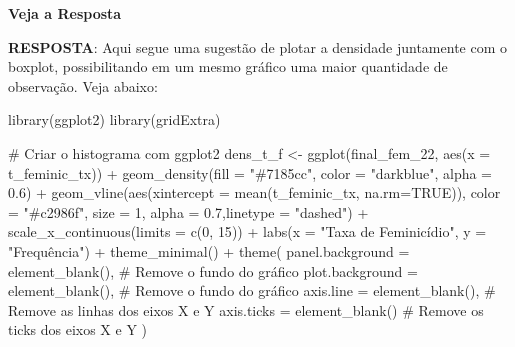 \documentclass[
  letterpaper,
  DIV=11,
  numbers=noendperiod]{scrreprt}
\newenvironment{Shaded}{\begin{snugshade}}{\end{snugshade}}
\newcommand{\AttributeTok}[1]{\textcolor[rgb]{0.40,0.45,0.13}{#1}}
\newcommand{\CommentTok}[1]{\textcolor[rgb]{0.37,0.37,0.37}{#1}}
\newcommand{\ConstantTok}[1]{\textcolor[rgb]{0.56,0.35,0.01}{#1}}
\newcommand{\DecValTok}[1]{\textcolor[rgb]{0.68,0.00,0.00}{#1}}
\newcommand{\FloatTok}[1]{\textcolor[rgb]{0.68,0.00,0.00}{#1}}
\newcommand{\FunctionTok}[1]{\textcolor[rgb]{0.28,0.35,0.67}{#1}}
\newcommand{\NormalTok}[1]{\textcolor[rgb]{0.00,0.23,0.31}{#1}}
\newcommand{\OtherTok}[1]{\textcolor[rgb]{0.00,0.23,0.31}{#1}}
\newcommand{\SpecialCharTok}[1]{\textcolor[rgb]{0.37,0.37,0.37}{#1}}
\newcommand{\StringTok}[1]{\textcolor[rgb]{0.13,0.47,0.30}{#1}}
\begin{document}
\begin{tcolorbox}[enhanced jigsaw, bottomrule=.15mm, leftrule=.75mm, arc=.35mm, colframe=quarto-callout-warning-color-frame, breakable, opacityback=0, toprule=.15mm, colback=white, left=2mm, rightrule=.15mm]
\begin{minipage}[t]{5.5mm}
\textcolor{quarto-callout-warning-color}{\faExclamationTriangle}
\end{minipage}%
\begin{minipage}[t]{\textwidth - 5.5mm}

\vspace{-3mm}\textbf{Veja a Resposta}\vspace{3mm}

\textbf{RESPOSTA}: Aqui segue uma sugestão de plotar a densidade
juntamente com o boxplot, possibilitando em um mesmo gráfico uma maior
quantidade de observação. Veja abaixo:

\begin{Shaded}
\begin{Highlighting}[]
\FunctionTok{library}\NormalTok{(ggplot2)}
\FunctionTok{library}\NormalTok{(gridExtra)}

\CommentTok{\# Criar o histograma com ggplot2}
\NormalTok{dens\_t\_f }\OtherTok{\textless{}{-}} \FunctionTok{ggplot}\NormalTok{(final\_fem\_22, }\FunctionTok{aes}\NormalTok{(}\AttributeTok{x =}\NormalTok{ t\_feminic\_tx)) }\SpecialCharTok{+}
  \FunctionTok{geom\_density}\NormalTok{(}\AttributeTok{fill =} \StringTok{"\#7185cc"}\NormalTok{, }\AttributeTok{color =} \StringTok{"darkblue"}\NormalTok{, }\AttributeTok{alpha =} \FloatTok{0.6}\NormalTok{) }\SpecialCharTok{+}
  \FunctionTok{geom\_vline}\NormalTok{(}\FunctionTok{aes}\NormalTok{(}\AttributeTok{xintercept =} \FunctionTok{mean}\NormalTok{(t\_feminic\_tx, }\AttributeTok{na.rm=}\ConstantTok{TRUE}\NormalTok{)), }\AttributeTok{color =} \StringTok{"\#c2986f"}\NormalTok{, }\AttributeTok{size =} \DecValTok{1}\NormalTok{, }\AttributeTok{alpha =} \FloatTok{0.7}\NormalTok{,}\AttributeTok{linetype =} \StringTok{"dashed"}\NormalTok{) }\SpecialCharTok{+}  
  \FunctionTok{scale\_x\_continuous}\NormalTok{(}\AttributeTok{limits =} \FunctionTok{c}\NormalTok{(}\DecValTok{0}\NormalTok{, }\DecValTok{15}\NormalTok{)) }\SpecialCharTok{+}
  \FunctionTok{labs}\NormalTok{(}\AttributeTok{x =} \StringTok{"Taxa de Feminicídio"}\NormalTok{, }\AttributeTok{y =} \StringTok{"Frequência"}\NormalTok{) }\SpecialCharTok{+}
  \FunctionTok{theme\_minimal}\NormalTok{()  }\SpecialCharTok{+}
  \FunctionTok{theme}\NormalTok{(}
    \AttributeTok{panel.background =} \FunctionTok{element\_blank}\NormalTok{(),  }\CommentTok{\# Remove o fundo do gráfico}
    \AttributeTok{plot.background =} \FunctionTok{element\_blank}\NormalTok{(),   }\CommentTok{\# Remove o fundo do gráfico}
    \AttributeTok{axis.line =} \FunctionTok{element\_blank}\NormalTok{(),         }\CommentTok{\# Remove as linhas dos eixos X e Y}
    \AttributeTok{axis.ticks =} \FunctionTok{element\_blank}\NormalTok{()        }\CommentTok{\# Remove os ticks dos eixos X e Y}
\NormalTok{  )}



\end{Highlighting}
\end{Shaded}
\end{minipage}
\end{tcolorbox}
\end{document}
